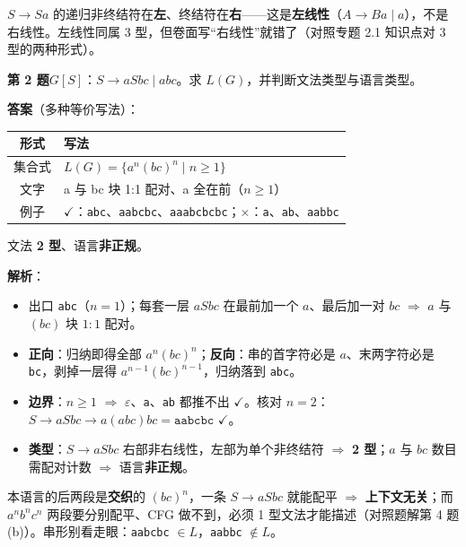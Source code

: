 \documentclass[12pt,a4paper,fontset=windows]{ctexart}
\newcommand{\ok}{\ensuremath{\checkmark}}
\newcommand{\bad}{\ensuremath{\times}}
\newcommand{\imp}{\ensuremath{\Rightarrow}}
\begin{document}
\begin{warnbox}[方向别判反]
$S \to Sa$ 的递归非终结符在\textbf{左}、终结符在\textbf{右}——这是\textbf{左线性}（$A \to Ba \mid a$），不是右线性。左线性同属 3 型，但卷面写``右线性''就错了（对照专题 2.1 知识点对 3 型的两种形式）。
\end{warnbox}

\begin{qbox}
{\large\bfseries 第 2 题}\quad $G[S]$：$S \to aSbc \mid abc$。求 $L(G)$，并判断文法类型与语言类型。
\end{qbox}

\textbf{答案}（多种等价写法）：

\begin{center}
\renewcommand{\arraystretch}{1.25}
\begin{tabular}{c p{11.2cm}}
\toprule
\textbf{形式} & \textbf{写法} \\
\midrule
集合式 & $L(G)=\{a^n (bc)^n \mid n \ge 1\}$ \\
文字 & a 与 bc 块 1:1 配对、a 全在前（$n \ge 1$） \\
例子 & \ok：\texttt{abc}、\texttt{aabcbc}、\texttt{aaabcbcbc}；\bad：\texttt{a}、\texttt{ab}、\texttt{aabbc} \\
\bottomrule
\end{tabular}
\end{center}

文法 \textbf{2 型}、语言\textbf{非正规}。

\textbf{解析}：
\begin{itemize}
\item 出口 \texttt{abc}（$n=1$）；每套一层 $aSbc$ 在最前加一个 $a$、最后加一对 $bc$ \imp{} $a$ 与 $(bc)$ 块 $1{:}1$ 配对。
\item \textbf{正向}：归纳即得全部 $a^n(bc)^n$；\textbf{反向}：串的首字符必是 $a$、末两字符必是 \texttt{bc}，剥掉一层得 $a^{n-1}(bc)^{n-1}$，归纳落到 \texttt{abc}。
\item \textbf{边界}：$n \ge 1$ \imp{} $\varepsilon$、\texttt{a}、\texttt{ab} 都推不出 \ok。核对 $n=2$：$S \to aSbc \to a(abc)bc = \texttt{aabcbc}$ \ok。
\item \textbf{类型}：$S \to aSbc$ 右部非右线性，左部为单个非终结符 \imp{} \textbf{2 型}；$a$ 与 $bc$ 数目需配对计数 \imp{} 语言\textbf{非正规}。
\end{itemize}

\begin{tipbox}
本语言的后两段是\textbf{交织}的 $(bc)^n$，一条 $S \to aSbc$ 就能配平 \imp{} \textbf{上下文无关}；而 $a^n b^n c^n$ 两段要分别配平、CFG 做不到，必须 1 型文法才能描述（对照题解第 4 题 (b)）。串形别看走眼：\texttt{aabcbc} $\in L$，\texttt{aabbc} $\notin L$。
\end{tipbox}
\end{document}
